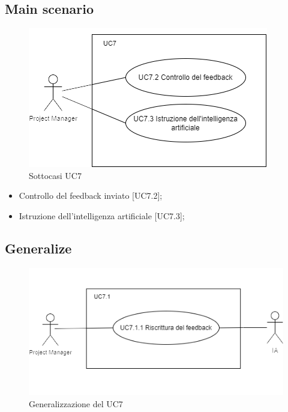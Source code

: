 \documentclass{article}
\begin{document}
    \subsection*{Main scenario}
        \begin{figure}[h]
            \centering
            \includegraphics{./imgUML/UC7-zoom.png}
            \caption{Sottocasi UC7}
            \label{fig:UC7_sottocasi}
        \end{figure}
        \begin{itemize}
            \item Controllo del feedback inviato [UC7.2];
            \item Istruzione dell'intelligenza artificiale [UC7.3];
        \end{itemize}
        
    \subsection*{Generalize}
      \begin{figure}[h]
            \centering
            \includegraphics{./imgUML/UC7-zoom1.png}
            \caption{Generalizzazione del UC7}
            \label{fig:UC7_generalizzazione}
        \end{figure}
\end{document}
